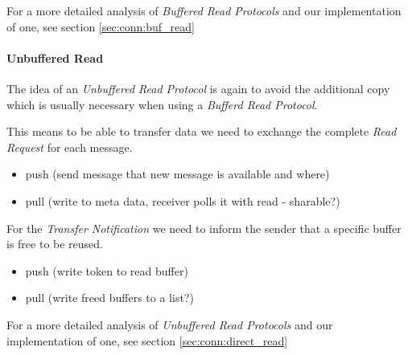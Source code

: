 For a more detailed analysis of \emph{Buffered Read Protocols} and our implementation of one, see section \ref{sec:conn:buf_read}

\paragraph{Unbuffered Read}
The idea of an \emph{Unbuffered Read Protocol} is again to avoid the additional copy which is usually necessary when using a
\emph{Bufferd Read Protocol}. 

This means to be able to transfer data we need to exchange the complete \emph{Read Request} for each message. 

\begin{itemize}
  \item push (send message that new message is available and where)
  \item pull (write to meta data, receiver polls it with read - sharable?)
\end{itemize}

For the \emph{Transfer Notification} we need to inform the sender that a specific buffer is free to be reused.

\begin{itemize}
  \item push (write token to read buffer)
  \item pull (write freed buffers to a list?)
\end{itemize}

For a more detailed analysis of \emph{Unbuffered Read Protocols} and our implementation of one, see section \ref{sec:conn:direct_read}
